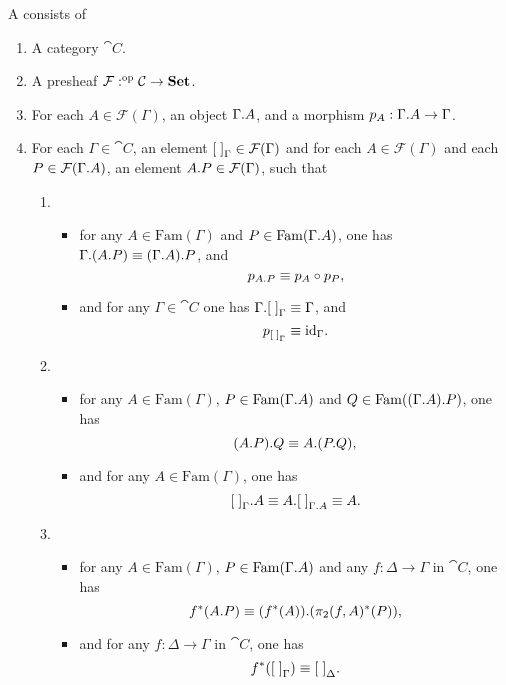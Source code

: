 \begin{defn}
A  consists of
\begin{enumerate}
\item A category $\cat{C}$.
\item A presheaf $\mathcal{F}:^{\mathrm{op}}{\mathcal{C}}\to\mathbf{Set}$.
\item For each $A\in\mathcal{F}(\Gamma)$, an object $\ctxext{\Gamma}{A}$, and a morphism $p_A:\ctxext{\Gamma}{A}\to\Gamma$.
\item For each $\Gamma\in\cat{C}$, an element ${[\;]}_{\Gamma}\in\mathcal{F}(\Gamma)$ and for each $A\in\mathcal{F}(\Gamma)$ and each $P\in\mathcal{F}(\ctxext{\Gamma}{A})$, an element $\ctxext{A}{P}\in\mathcal{F}(\Gamma)$, such that
\begin{enumerate}
\item 
\begin{itemize}
\item for any $A\in\mathrm{Fam}(\Gamma)$ and $P\in\mathrm{Fam}(\ctxext{\Gamma}{A})$,
one has $\ctxext{\Gamma}{{A}{P}}\jdeq\ctxext{{\Gamma}{A}}{P}$, and
\begin{equation*}
p_{\ctxext{A}{P}}\jdeq p_A\circ p_P,
\end{equation*}
\item and for any $\Gamma\in\cat{C}$ one has $\ctxext{\Gamma}{\emptyf[\Gamma]}\jdeq\Gamma$, and
\begin{equation*}
p_{{[\;]}_{\Gamma}}\equiv{\mathrm{id}_{\Gamma}}.
\end{equation*}
\end{itemize}
\item 
\begin{itemize}
\item for any $A\in\mathrm{Fam}(\Gamma)$, $P\in\mathrm{Fam}(\ctxext{\Gamma}{A})$
and $Q\in\mathrm{Fam}(\ctxext{{\Gamma}{A}}{P})$, one has
\begin{equation*}
\ctxext{{A}{P}}{Q}\jdeq\ctxext{A}{{P}{Q}},
\end{equation*}
\item and for any $A\in\mathrm{Fam}(\Gamma)$, one has
\begin{equation*}
\ctxext{\emptyf[\Gamma]}{A}\jdeq\ctxext{A}{\emptyf[\ctxext{\Gamma}{A}]}\jdeq A.
\end{equation*}
\end{itemize}
\item 
\begin{itemize}
\item for any $A\in\mathrm{Fam}(\Gamma)$, $P\in\mathrm{Fam}(\ctxext{\Gamma}{A})$
and any $f:\Delta\to\Gamma$ in $\cat{C}$, one has
\begin{equation*}
f^\ast(\ctxext{A}{P})\jdeq \ctxext{(f^\ast(A))}{(\pi_2(f,A)^\ast(P))},
\end{equation*}
\item and for any $f:\Delta\to\Gamma$ in $\cat{C}$, one has
\begin{equation*}
f^\ast({[\;]}_{\Gamma})\equiv{[\;]}_{\Delta}.
\end{equation*}
\end{itemize}
\end{enumerate} 
\end{enumerate}
\end{defn}


